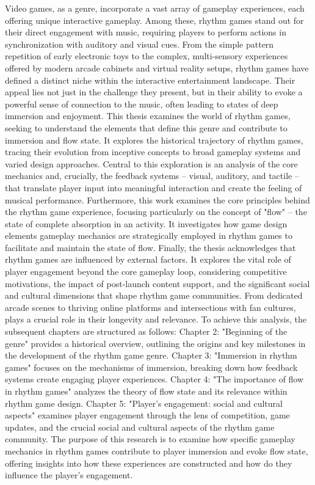 Video games, as a genre, incorporate a vast array of gameplay experiences, each offering unique interactive gameplay. Among these, rhythm games stand out for their direct engagement with music, requiring players to perform actions in synchronization with auditory and visual cues. From the simple pattern repetition of early electronic toys to the complex, multi-sensory experiences offered by modern arcade cabinets and virtual reality setups, rhythm games have defined a distinct niche within the interactive entertainment landscape. Their appeal lies not just in the challenge they present, but in their ability to evoke a powerful sense of connection to the music, often leading to states of deep immersion and enjoyment.
This thesis examines the world of rhythm games, seeking to understand the elements that define this genre and contribute to immersion and flow state. It explores the historical trajectory of rhythm games, tracing their evolution from inceptive concepts to broad gameplay systems and varied design approaches. Central to this exploration is an analysis of the core mechanics and, crucially, the feedback systems -- visual, auditory, and tactile -- that translate player input into meaningful interaction and create the feeling of musical performance.
Furthermore, this work examines the core principles behind the rhythm game experience, focusing particularly on the concept of "flow" -- the state of complete absorption in an activity. It investigates how game design elements  gameplay mechanics are strategically employed in rhythm games to facilitate and maintain the state of flow.
Finally, the thesis acknowledges that rhythm games are influenced by external factors. It explores the vital role of player engagement beyond the core gameplay loop, considering competitive motivations, the impact of post-launch content support, and the significant social and cultural dimensions that shape rhythm game communities. From dedicated arcade scenes to thriving online platforms and intersections with fan cultures, plays a crucial role in their longevity and relevance. 
To achieve this analysis, the subsequent chapters are structured as follows: Chapter 2: "Beginning of the genre" provides a historical overview, outlining the origins and key milestones in the development of the rhythm game genre. Chapter 3: "Immersion in rhythm games" focuses on the mechanisms of immersion, breaking down how feedback systems create engaging player experiences. Chapter 4: "The importance of flow in rhythm games" analyzes the theory of flow state and its relevance within rhythm game design. Chapter 5: "Player's engagement: social and cultural aspects" examines player engagement through the lens of competition, game updates, and the crucial social and cultural aspects of the rhythm game community.
The purpose of this research is to examine how specific gameplay mechanics in rhythm games contribute to player immersion and evoke flow state, offering insights into how these experiences are constructed and how do they influence the player's engagement.